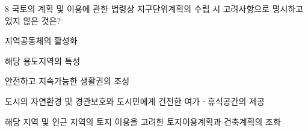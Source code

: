 \begin{question}{8}
국토의 계획 및 이용에 관한 법령상 지구단위계획의 수립 시 고려사항으로 명시하고 있지 않은 것은?
\begin{choices}
  \item 지역공동체의 활성화
  \item 해당 용도지역의 특성
  \item 안전하고 지속가능한 생활권의 조성
  \item 도시의 자연환경 및 경관보호와 도시민에게 건전한 여가ㆍ휴식공간의 제공
  \item 해당 지역 및 인근 지역의 토지 이용을 고려한 토지이용계획과 건축계획의 조화
\end{choices}
\end{question}

